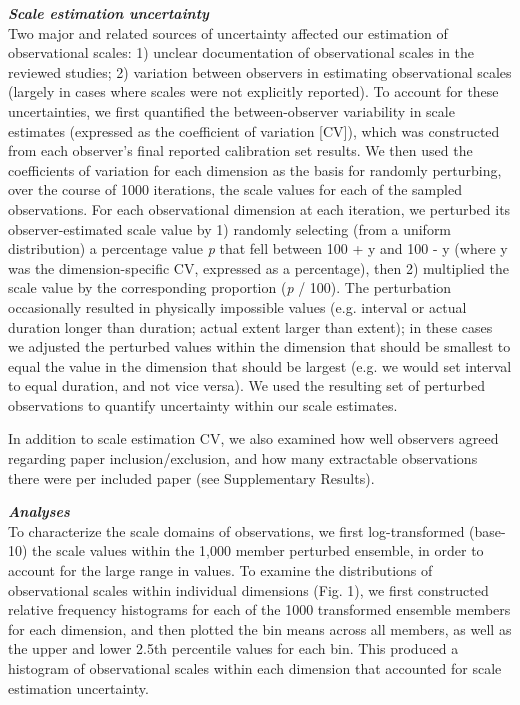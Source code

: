 \documentclass[12pt]{article}
\begin{document}
\vspace{5pt}
\noindent \textbf{\emph{Scale estimation uncertainty}}\\
Two major and related sources of uncertainty affected our estimation of observational scales: 1) unclear documentation of observational scales in the reviewed studies; 2) variation between observers in estimating observational scales (largely in cases where scales were not explicitly reported). To account for these uncertainties, we first quantified the between-observer variability in scale estimates (expressed as the coefficient of variation [CV]), which was constructed from each observer's final reported calibration set results. We then used the coefficients of variation for each dimension as the basis for randomly perturbing, over the course of 1000 iterations, the scale values for each of the sampled observations. For each observational dimension at each iteration, we perturbed its observer-estimated scale value by 1) randomly selecting (from a uniform distribution) a percentage value \emph{p} that fell between 100 + y and 100 - y (where y was the dimension-specific CV, expressed as a percentage), then 2) multiplied the scale value by the corresponding proportion (\emph{p} / 100). The perturbation occasionally resulted in physically impossible values (e.g. interval or actual duration longer than duration; actual extent larger than extent); in these cases we adjusted the perturbed values within the dimension that should be smallest to equal the value in the dimension that should be largest (e.g. we would set interval to equal duration, and not vice versa). We used the resulting set of perturbed observations to quantify uncertainty within our scale estimates. 

In addition to scale estimation CV, we also examined how well observers agreed regarding paper inclusion/exclusion, and how many extractable observations there were per included paper (see Supplementary Results). 

\vspace{5pt}
\noindent \textbf{\emph{Analyses}}\\
To characterize the scale domains of observations, we first log-transformed (base-10) the scale values within the 1,000 member perturbed ensemble, in order to account for the large range in values. To examine the distributions of observational scales within individual dimensions (Fig. 1), we first constructed relative frequency histograms for each of the 1000 transformed ensemble members for each dimension, and then plotted the bin means across all members, as well as the upper and lower 2.5th percentile values for each bin. This produced a histogram of observational scales within each dimension that accounted for scale estimation uncertainty. 
\end{document}
